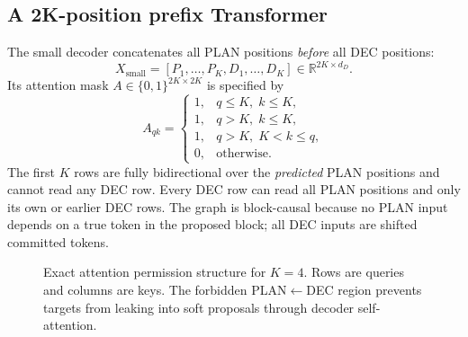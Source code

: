 \documentclass[11pt,letterpaper]{article}
\newcommand{\R}{\mathbb{R}}
\begin{document}
\subsection{A 2K-position prefix Transformer}
The small decoder concatenates all PLAN positions \emph{before} all DEC positions:
\begin{equation}
  X_{\mathrm{small}}=[P_1,\ldots,P_K,D_1,\ldots,D_K]\in\R^{2K\times d_D}.
\end{equation}
Its attention mask $A\in\{0,1\}^{2K\times2K}$ is specified by
\begin{equation}
  A_{qk}=\begin{cases}
    1,&q\leq K,\;k\leq K,\\
    1,&q>K,\;k\leq K,\\
    1,&q>K,\;K<k\leq q,\\
    0,&\text{otherwise.}
  \end{cases}
  \label{eq:mask}
\end{equation}
The first $K$ rows are fully bidirectional over the \emph{predicted} PLAN positions and cannot read any DEC row. Every DEC row can read all PLAN positions and only its own or earlier DEC rows. The graph is block-causal because no PLAN input depends on a true token in the proposed block; all DEC inputs are shifted committed tokens.

\begin{figure}[ht]
\centering
{}
\caption{Exact attention permission structure for $K=4$. Rows are queries and columns are keys. The forbidden PLAN$\leftarrow$DEC region prevents targets from leaking into soft proposals through decoder self-attention.}
\label{fig:mask}
\end{figure}
\end{document}
